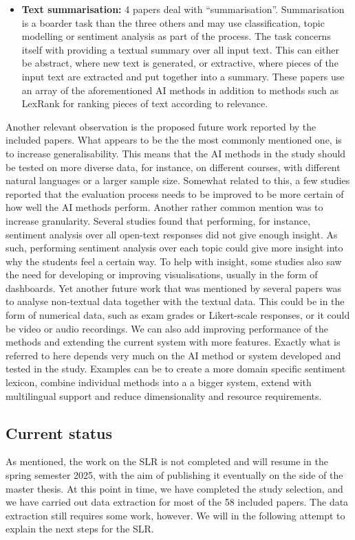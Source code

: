 \begin{itemize}
    \item \textbf{Text summarisation:}
    4 papers deal with ``summarisation''. Summarisation is a boarder task than the three others and may use classification, topic modelling or sentiment analysis as part of the process. The task concerns itself with providing a textual summary over all input text. This can either be abstract, where new text is generated, or extractive, where pieces of the input text are extracted and put together into a summary. These papers use an array of the aforementioned AI methods in addition to methods such as LexRank for ranking pieces of text according to relevance.
\end{itemize}

Another relevant observation is the proposed future work reported by the included papers. What appears to be the the most commonly mentioned one, is to increase generalisability. This means that the AI methods in the study should be tested on more diverse data, for instance, on different courses, with different natural languages or a larger sample size. Somewhat related to this, a few studies reported that the evaluation process needs to be improved to be more certain of how well the AI methods perform. Another rather common mention was to increase granularity. Several studies found that performing, for instance, sentiment analysis over all open-text responses did not give enough insight. As such, performing sentiment analysis over each topic could give more insight into why the students feel a certain way. To help with insight, some studies also saw the need for developing or improving visualisations, usually in the form of dashboards. Yet another future work that was mentioned by several papers was to analyse non-textual data together with the textual data. This could be in the form of numerical data, such as exam grades or Likert-scale responses, or it could be video or audio recordings. We can also add improving performance of the methods and extending the current system with more features. Exactly what is referred to here depends very much on the AI method or system developed and tested in the study. Examples can be to create a more domain specific sentiment lexicon, combine individual methods into a a bigger system, extend with multilingual support and reduce dimensionality and resource requirements.

\subsection{Current status}
As mentioned, the work on the SLR is not completed and will resume in the spring semester 2025, with the aim of publishing it eventually on the side of the master thesis. At this point in time, we have completed the study selection, and we have carried out data extraction for most of the 58 included papers. The data extraction still requires some work, however. We will in the following attempt to explain the next steps for the SLR.

